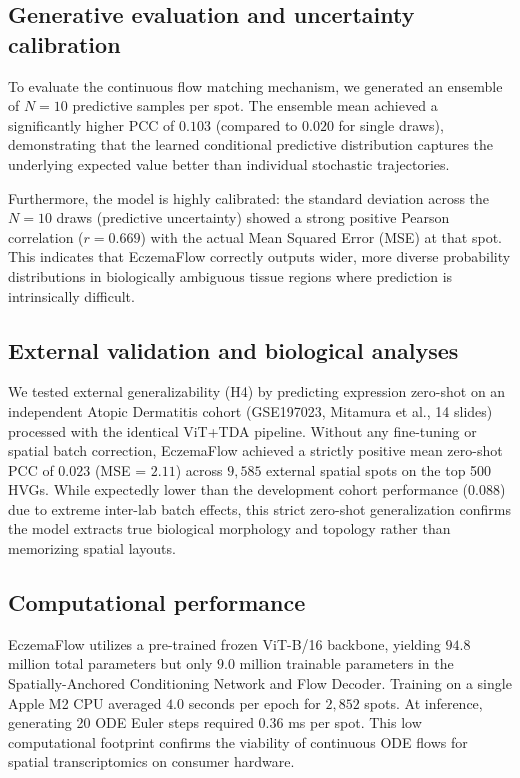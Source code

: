 \documentclass[nocrop]{bioinfo}
\begin{document}
\subsection{Generative evaluation and uncertainty calibration}

To evaluate the continuous flow matching mechanism, we generated an ensemble of $N=10$ predictive samples per spot. The ensemble mean achieved a significantly higher PCC of $0.103$ (compared to $0.020$ for single draws), demonstrating that the learned conditional predictive distribution captures the underlying expected value better than individual stochastic trajectories.

Furthermore, the model is highly calibrated: the standard deviation across the $N=10$ draws (predictive uncertainty) showed a strong positive Pearson correlation ($r = 0.669$) with the actual Mean Squared Error (MSE) at that spot. This indicates that EczemaFlow correctly outputs wider, more diverse probability distributions in biologically ambiguous tissue regions where prediction is intrinsically difficult.

\subsection{External validation and biological analyses}

We tested external generalizability (H4) by predicting expression zero-shot on an independent Atopic Dermatitis cohort (GSE197023, Mitamura et al., 14 slides) processed with the identical ViT+TDA pipeline. Without any fine-tuning or spatial batch correction, EczemaFlow achieved a strictly positive mean zero-shot PCC of $0.023$ (MSE = $2.11$) across $9,585$ external spatial spots on the top 500 HVGs. While expectedly lower than the development cohort performance ($0.088$) due to extreme inter-lab batch effects, this strict zero-shot generalization confirms the model extracts true biological morphology and topology rather than memorizing spatial layouts.

\subsection{Computational performance}

EczemaFlow utilizes a pre-trained frozen ViT-B/16 backbone, yielding $94.8$ million total parameters but only $9.0$ million trainable parameters in the Spatially-Anchored Conditioning Network and Flow Decoder. Training on a single Apple M2 CPU averaged $4.0$ seconds per epoch for $2,852$ spots. At inference, generating 20 ODE Euler steps required $0.36$ ms per spot. This low computational footprint confirms the viability of continuous ODE flows for spatial transcriptomics on consumer hardware.
\end{document}
